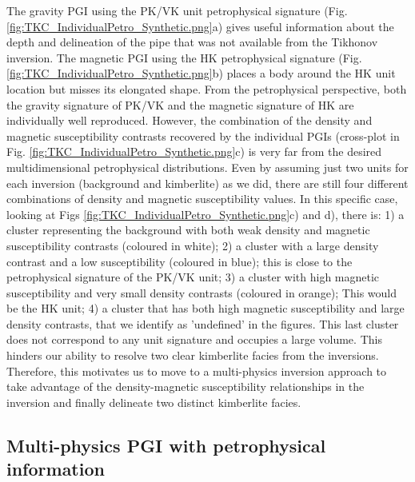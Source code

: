 \documentclass[extra, mreferee]{gji_joint} %
\begin{document}
The gravity PGI using the PK/VK unit petrophysical signature (Fig. \ref{fig:TKC_IndividualPetro_Synthetic.png}a) gives useful information about the depth and delineation of the pipe that was not available from the Tikhonov inversion. The magnetic PGI using the HK petrophysical signature (Fig. \ref{fig:TKC_IndividualPetro_Synthetic.png}b) places a body around the HK unit location but misses its elongated shape. From the petrophysical perspective, both the gravity signature of PK/VK and the magnetic signature of HK are individually well reproduced. However, the combination of the density and magnetic susceptibility contrasts recovered by the individual PGIs (cross-plot in Fig. \ref{fig:TKC_IndividualPetro_Synthetic.png}c) is very far from the desired multidimensional petrophysical distributions. Even by assuming just two units for each inversion (background and kimberlite) as we did, there are still four different combinations of density and magnetic susceptibility values. In this specific case, looking at Figs \ref{fig:TKC_IndividualPetro_Synthetic.png}c) and d), there is: 1) a cluster representing the background with both weak density and magnetic susceptibility contrasts (coloured in white); 2) a cluster with a large density contrast and a low susceptibility (coloured in blue); this is close to the petrophysical signature of the PK/VK unit; 3) a cluster with high magnetic susceptibility and very small density contrasts (coloured in orange); This would be the HK unit; 4) a cluster that has both high magnetic susceptibility and large density contrasts, that we identify as 'undefined' in the figures. This last cluster does not correspond to any unit signature and occupies a large volume. This hinders our ability to resolve two clear kimberlite facies from the inversions. Therefore, this motivates us to move to a multi-physics inversion approach to take advantage of the density-magnetic susceptibility relationships in the inversion and finally delineate two distinct kimberlite facies.


\subsection{Multi-physics PGI with petrophysical information} \label{sec:multiphysics_full}
\end{document}
